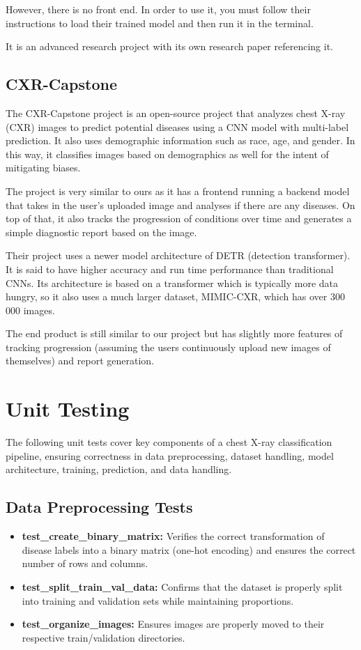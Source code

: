 \documentclass[12pt, titlepage]{article}
\begin{document}
However, there is no front end. In order to use it, you must follow their instructions to load their trained model and then run it in the terminal.

It is an advanced research project with its own research paper referencing it.

\subsection{CXR-Capstone}
The CXR-Capstone project is an open-source project that analyzes chest X-ray (CXR) images to predict potential diseases using a CNN model with multi-label prediction. It also uses demographic information such as race, age, and gender. In this way, it classifies images based on demographics as well for the intent of mitigating biases.

The project is very similar to ours as it has a frontend running a backend model that takes in the user’s uploaded image and analyses if there are any diseases. On top of that, it also tracks the progression of conditions over time and generates a simple diagnostic report based on the image.

Their project uses a newer model architecture of DETR (detection transformer). It is said to have higher accuracy and run time performance than traditional CNNs. Its architecture is based on a transformer which is typically more data hungry, so it also uses a much larger dataset, MIMIC-CXR, which has over 300 000 images.

The end product is still similar to our project but has slightly more features of tracking progression (assuming the users continuously upload new images of themselves) and report generation.


\section{Unit Testing}
The following unit tests cover key components of a chest X-ray classification pipeline, ensuring correctness in data preprocessing, dataset handling, model architecture, training, prediction, and data handling.

\subsection{Data Preprocessing Tests}
\begin{itemize}
    \item \textbf{test\_create\_binary\_matrix:} Verifies the correct transformation of disease labels into a binary matrix (one-hot encoding) and ensures the correct number of rows and columns.
    \item \textbf{test\_split\_train\_val\_data:} Confirms that the dataset is properly split into training and validation sets while maintaining proportions.
    \item \textbf{test\_organize\_images:} Ensures images are properly moved to their respective train/validation directories.
\end{itemize}
\end{document}
